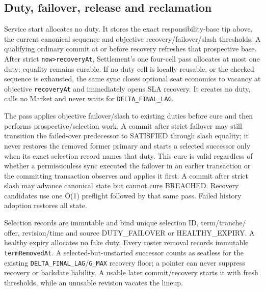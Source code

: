 \documentclass[a4paper,11pt]{article}
\newcommand{\code}[1]{\nolinkurl{#1}}
\begin{document}
\subsection{Duty, failover, release and reclamation}

Service start allocates no duty.  It stores the exact responsibility-base tip
above, the current canonical sequence and objective recovery/failover/slash
thresholds.  A qualifying ordinary commit at
or before recovery refreshes that prospective base.  After strict
\code{now>recoveryAt}, Settlement's one four-cell pass allocates at most one duty;
equality remains curable.  If no duty cell is locally reusable, or the checked
sequence is exhausted, the same sync closes optional seat economics to vacancy
at objective \code{recoveryAt} and immediately opens SLA recovery.  It creates
no duty, calls no Market and never waits for \code{DELTA_FINAL_LAG}.

The pass applies objective failover/slash to existing duties before cure and
then performs prospective/selection work.  A commit after strict failover may
still transition the failed-over predecessor to SATISFIED through slash
equality; it never restores the removed former primary and starts a selected
successor only when its exact selection record names that duty.  This cure is
valid regardless of whether a permissionless sync executed the failover in an
earlier transaction or the committing transaction observes and applies it
first.  A commit after strict slash
may advance canonical state but cannot cure BREACHED.  Recovery candidates use
one O(1) preflight followed by that same pass.  Failed history adoption restores
all state.

Selection records are immutable and bind unique selection ID, term/tranche/
offer, revision/time and source DUTY\_FAILOVER or HEALTHY\_EXPIRY.  A healthy
expiry allocates no fake duty.  Every roster removal records immutable
\code{termRemovedAt}.  A selected-but-unstarted successor counts as seatless for
the existing \code{DELTA_FINAL_LAG}/\code{G_MAX} recovery floor; a pointer can
never suppress recovery or backdate liability.  A usable later commit/recovery
starts it with fresh thresholds, while an unusable revision vacates the lineup.
\end{document}
